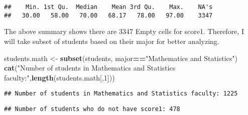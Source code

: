 \documentclass[
]{article}
\newenvironment{Shaded}{\begin{snugshade}}{\end{snugshade}}
\newcommand{\DecValTok}[1]{\textcolor[rgb]{0.00,0.00,0.81}{#1}}
\newcommand{\KeywordTok}[1]{\textcolor[rgb]{0.13,0.29,0.53}{\textbf{#1}}}
\newcommand{\NormalTok}[1]{#1}
\newcommand{\OperatorTok}[1]{\textcolor[rgb]{0.81,0.36,0.00}{\textbf{#1}}}
\newcommand{\StringTok}[1]{\textcolor[rgb]{0.31,0.60,0.02}{#1}}
\begin{document}
\begin{Shaded}
\end{Shaded}

\begin{verbatim}
##    Min. 1st Qu.  Median    Mean 3rd Qu.    Max.    NA's 
##   30.00   58.00   70.00   68.17   78.00   97.00    3347
\end{verbatim}

The above summary shows there are 3347 Empty cells for score1.
Therefore, I will take subset of students based on their major for
better analyzing.

\begin{Shaded}
\begin{Highlighting}[]
\NormalTok{students.math <-}\StringTok{ }\KeywordTok{subset}\NormalTok{(students, major}\OperatorTok{==}\StringTok{"Mathematics and Statistics"}\NormalTok{)}
\KeywordTok{cat}\NormalTok{(}\StringTok{"Number of students in Mathematics and Statistics faculty:"}\NormalTok{,}\KeywordTok{length}\NormalTok{(students.math[,}\DecValTok{1}\NormalTok{]))}
\end{Highlighting}
\end{Shaded}

\begin{verbatim}
## Number of students in Mathematics and Statistics faculty: 1225
\end{verbatim}

\begin{Shaded}
\end{Shaded}

\begin{verbatim}
## Number of students who do not have score1: 478
\end{verbatim}

\begin{Shaded}
\end{Shaded}
\end{document}
